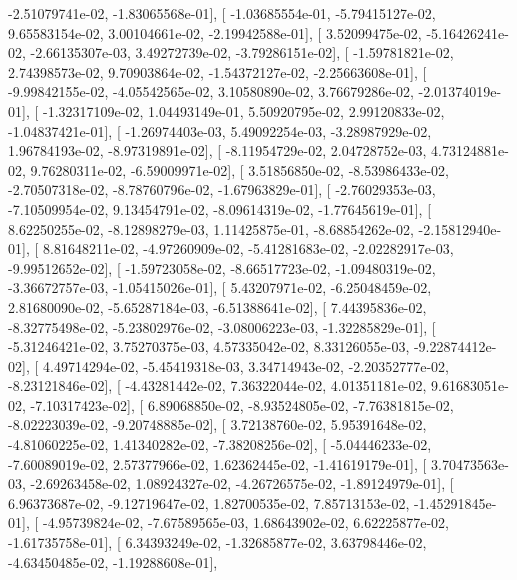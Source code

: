 \documentclass{article}
\begin{document}
         -2.51079741e-02,  -1.83065568e-01],
       [ -1.03685554e-01,  -5.79415127e-02,   9.65583154e-02,
          3.00104661e-02,  -2.19942588e-01],
       [  3.52099475e-02,  -5.16426241e-02,  -2.66135307e-03,
          3.49272739e-02,  -3.79286151e-02],
       [ -1.59781821e-02,   2.74398573e-02,   9.70903864e-02,
         -1.54372127e-02,  -2.25663608e-01],
       [ -9.99842155e-02,  -4.05542565e-02,   3.10580890e-02,
          3.76679286e-02,  -2.01374019e-01],
       [ -1.32317109e-02,   1.04493149e-01,   5.50920795e-02,
          2.99120833e-02,  -1.04837421e-01],
       [ -1.26974403e-03,   5.49092254e-03,  -3.28987929e-02,
          1.96784193e-02,  -8.97319891e-02],
       [ -8.11954729e-02,   2.04728752e-03,   4.73124881e-02,
          9.76280311e-02,  -6.59009971e-02],
       [  3.51856850e-02,  -8.53986433e-02,  -2.70507318e-02,
         -8.78760796e-02,  -1.67963829e-01],
       [ -2.76029353e-03,  -7.10509954e-02,   9.13454791e-02,
         -8.09614319e-02,  -1.77645619e-01],
       [  8.62250255e-02,  -8.12898279e-03,   1.11425875e-01,
         -8.68854262e-02,  -2.15812940e-01],
       [  8.81648211e-02,  -4.97260909e-02,  -5.41281683e-02,
         -2.02282917e-03,  -9.99512652e-02],
       [ -1.59723058e-02,  -8.66517723e-02,  -1.09480319e-02,
         -3.36672757e-03,  -1.05415026e-01],
       [  5.43207971e-02,  -6.25048459e-02,   2.81680090e-02,
         -5.65287184e-03,  -6.51388641e-02],
       [  7.44395836e-02,  -8.32775498e-02,  -5.23802976e-02,
         -3.08006223e-03,  -1.32285829e-01],
       [ -5.31246421e-02,   3.75270375e-03,   4.57335042e-02,
          8.33126055e-03,  -9.22874412e-02],
       [  4.49714294e-02,  -5.45419318e-03,   3.34714943e-02,
         -2.20352777e-02,  -8.23121846e-02],
       [ -4.43281442e-02,   7.36322044e-02,   4.01351181e-02,
          9.61683051e-02,  -7.10317423e-02],
       [  6.89068850e-02,  -8.93524805e-02,  -7.76381815e-02,
         -8.02223039e-02,  -9.20748885e-02],
       [  3.72138760e-02,   5.95391648e-02,  -4.81060225e-02,
          1.41340282e-02,  -7.38208256e-02],
       [ -5.04446233e-02,  -7.60089019e-02,   2.57377966e-02,
          1.62362445e-02,  -1.41619179e-01],
       [  3.70473563e-03,  -2.69263458e-02,   1.08924327e-02,
         -4.26726575e-02,  -1.89124979e-01],
       [  6.96373687e-02,  -9.12719647e-02,   1.82700535e-02,
          7.85713153e-02,  -1.45291845e-01],
       [ -4.95739824e-02,  -7.67589565e-03,   1.68643902e-02,
          6.62225877e-02,  -1.61735758e-01],
       [  6.34393249e-02,  -1.32685877e-02,   3.63798446e-02,
         -4.63450485e-02,  -1.19288608e-01],
\end{document}
